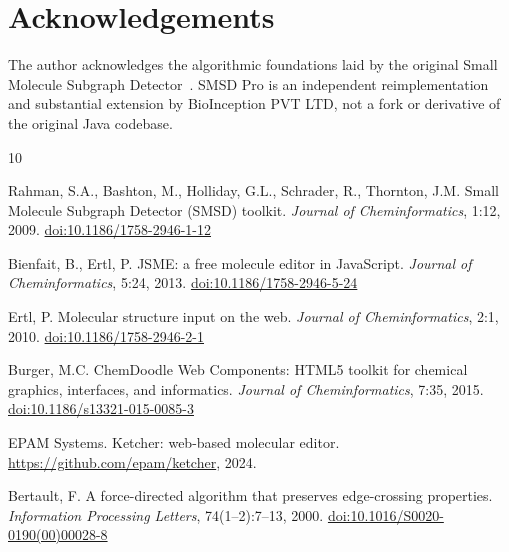 \documentclass[twocolumn]{article}
\begin{document}
\section*{Acknowledgements}

The author acknowledges the algorithmic foundations laid by the original
Small Molecule Subgraph Detector~\citep{Rahman2009}.  SMSD Pro is an
independent reimplementation and substantial extension by BioInception
PVT LTD, not a fork or derivative of the original Java codebase.

\begin{thebibliography}{10}

Rahman, S.A., Bashton, M., Holliday, G.L., Schrader, R., Thornton, J.M.
\newblock Small Molecule Subgraph Detector (SMSD) toolkit.
\newblock \emph{Journal of Cheminformatics}, 1:12, 2009.
\newblock \href{https://doi.org/10.1186/1758-2946-1-12}{doi:10.1186/1758-2946-1-12}

Bienfait, B., Ertl, P.
\newblock JSME: a free molecule editor in JavaScript.
\newblock \emph{Journal of Cheminformatics}, 5:24, 2013.
\newblock \href{https://doi.org/10.1186/1758-2946-5-24}{doi:10.1186/1758-2946-5-24}

Ertl, P.
\newblock Molecular structure input on the web.
\newblock \emph{Journal of Cheminformatics}, 2:1, 2010.
\newblock \href{https://doi.org/10.1186/1758-2946-2-1}{doi:10.1186/1758-2946-2-1}

Burger, M.C.
\newblock ChemDoodle Web Components: HTML5 toolkit for chemical graphics,
  interfaces, and informatics.
\newblock \emph{Journal of Cheminformatics}, 7:35, 2015.
\newblock \href{https://doi.org/10.1186/s13321-015-0085-3}{doi:10.1186/s13321-015-0085-3}

EPAM Systems.
\newblock Ketcher: web-based molecular editor.
\newblock \url{https://github.com/epam/ketcher}, 2024.

Bertault, F.
\newblock A force-directed algorithm that preserves edge-crossing properties.
\newblock \emph{Information Processing Letters}, 74(1--2):7--13, 2000.
\newblock \href{https://doi.org/10.1016/S0020-0190(00)00028-8}{doi:10.1016/S0020-0190(00)00028-8}


\end{thebibliography}
\end{document}
